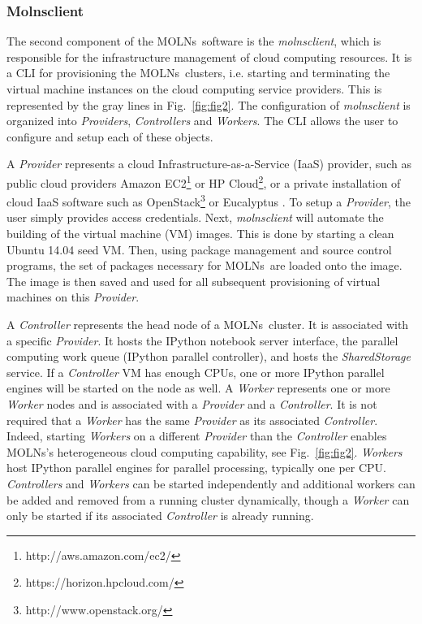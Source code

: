 \documentclass[final,leqno,onefignum,onetabnum]{siamltex1213}
\def\packagename {MOLNs}
\begin{document}
\subsubsection{Molnsclient}
\label{sec:molns}
The second component of the \packagename~software is the \emph{molnsclient}, which is responsible for the infrastructure management of cloud computing resources.  It is a CLI for provisioning the \packagename~clusters, i.e. starting and terminating the virtual machine instances on the cloud computing service providers.  This is represented by the gray lines in Fig.~\ref{fig:fig2}.
The configuration of \emph{molnsclient} is organized into \emph{Providers}, \emph{Controllers} and \emph{Workers}. The CLI allows the user to configure and setup each of these objects.

A \emph{Provider} represents a cloud Infrastructure-as-a-Service (IaaS) provider, such as public cloud providers Amazon EC2\footnote{http://aws.amazon.com/ec2/} or HP Cloud\footnote{https://horizon.hpcloud.com/}, or a private installation of cloud IaaS software such as OpenStack\footnote{http://www.openstack.org/} or Eucalyptus \cite{eucalyptus}. To setup a \emph{Provider}, the user simply provides access credentials. Next, \emph{molnsclient} will automate the building of the virtual machine (VM) images.  This is done by starting a clean Ubuntu 14.04 seed VM. Then, using package management and source control programs, 
the set of packages necessary for \packagename~are loaded onto the image.  The image is then saved and used for all subsequent provisioning of virtual machines on this \emph{Provider}. 

A \emph{Controller} represents the head node of a \packagename~cluster. It is associated with a specific \emph{Provider}. It hosts the IPython notebook server interface, the parallel computing work queue (IPython parallel  controller), and hosts the \emph{SharedStorage} service.
If a \emph{Controller} VM has enough CPUs, one or more IPython parallel engines will be started on the node as well.
A \emph{Worker} represents one or more \emph{Worker} nodes and is associated with a \emph{Provider} and a \emph{Controller}.  It is not required that a \emph{Worker} has the same \emph{Provider} as its associated \emph{Controller}.  Indeed, starting \emph{Workers} on a different \emph{Provider} than the \emph{Controller} enables \packagename's heterogeneous cloud computing capability, see Fig.~\ref{fig:fig2}. \emph{Workers} host IPython parallel engines for parallel processing, typically one per CPU.  \emph{Controllers} and \emph{Workers} can be started independently and additional workers can be added and removed from a running cluster dynamically, though a \emph{Worker} can only be started if its associated \emph{Controller} is already running.
\end{document}
